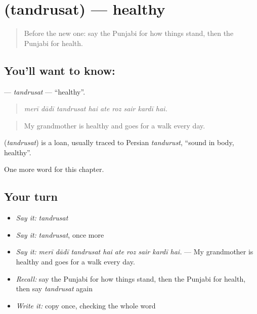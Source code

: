\section[\texorpdfstring{\pa{ਤੰਦਰੁਸਤ} (tandrusat)}{ਤੰਦਰੁਸਤ (tandrusat)}]{ (tandrusat) — healthy}

\label{lesson:PA-C319-tandrusat}



\begin{quote}
Before the new one: say the Punjabi for how things stand, then the Punjabi for health.
\end{quote}

\subsection*{You'll want to know: }
\textbf{} — \emph{tandrusat} — \textquotedblleft{}healthy\textquotedblright{}.

\begin{quote}
        
\end{quote}

\begin{quote}
\emph{merī dādī tandrusat hai ate roz sair kardī hai.}
\end{quote}

\begin{quote}
My grandmother is healthy and goes for a walk every day.
\end{quote}

\begin{cousinweb}
\textbf{} (\emph{tandrusat}) is a loan, usually traced to Persian \emph{tandurust}, \textquotedblleft{}sound in body, healthy\textquotedblright{}.
\end{cousinweb}

\begin{grammarlens}[title={What you've built}]
One more word for this chapter.
\end{grammarlens}

\subsection*{Your turn}
\begin{itemize}
\raggedright
  \item \emph{Say it:} \emph{tandrusat}
  \item \emph{Say it:} \emph{tandrusat}, once more
  \item \emph{Say it:} \emph{merī dādī tandrusat hai ate roz sair kardī hai.} — My grandmother is healthy and goes for a walk every day.
  \item \emph{Recall:} say the Punjabi for how things stand, then the Punjabi for health, then say \emph{tandrusat} again
  \item \emph{Write it:} copy \textbf{} once, checking the whole word
\end{itemize}


